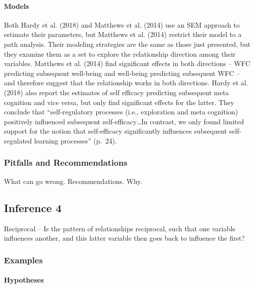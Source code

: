 \documentclass[english,,man]{apa6}
\let\oldparagraph\paragraph
\renewcommand{\paragraph}[1]{\oldparagraph{#1}\mbox{}}
\theoremstyle{definition}
\theoremstyle{definition}
\theoremstyle{definition}
\theoremstyle{remark}
\begin{document}
\hypertarget{models-9}{%
\paragraph{Models}\label{models-9}}

Both Hardy et al. (2018) and Matthews et al. (2014) use an SEM approach
to estimate their parameters, but Matthews et al. (2014) restrict their
model to a path analysis. Their modeling strategies are the same as
those just presented, but they examine them as a set to explore the
relationship direction among their variables. Matthews et al. (2014)
find significant effects in both directions -- WFC predicting subsequent
well-being and well-being predicting subsequent WFC -- and therefore
suggest that the relationship works in both directions. Hardy et al.
(2018) also report the estimates of self efficacy predicting subsequent
meta cognition and vice versa, but only find significant effects for the
latter. They conclude that \enquote{self-regulatory processes (i.e.,
exploration and meta cognition) positively influenced subsequent
self-efficacy\ldots{}In contrast, we only found limited support for the
notion that self-efficacy significantly influences subsequent
self-regulated learning processes} (p.~24).

\hypertarget{pitfalls-and-recommendations-9}{%
\subsubsection{Pitfalls and
Recommendations}\label{pitfalls-and-recommendations-9}}

What can go wrong. Recommendations. Why.

\hypertarget{inference-4-1}{%
\subsection{Inference 4}\label{inference-4-1}}

Reciprocal -- Is the pattern of relationships reciprocal, such that one
variable influences another, and this latter variable then goes back to
influence the first?

\hypertarget{examples-9}{%
\subsubsection{Examples}\label{examples-9}}

\hypertarget{hypotheses-10}{%
\paragraph{Hypotheses}\label{hypotheses-10}}
\end{document}
